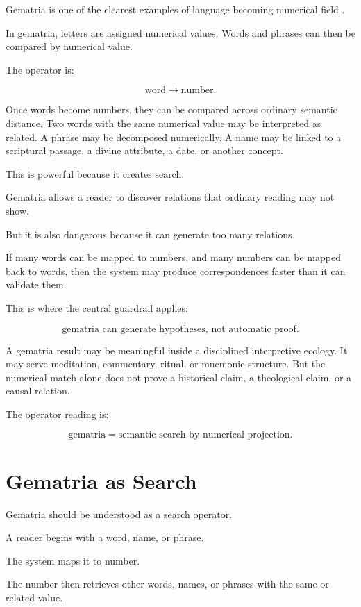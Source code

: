 \documentclass[11pt]{book}
\begin{document}
Gematria is one of the clearest examples of language becoming numerical field \cite{Scholem1974Kabbalah,Idel1988KabbalahNewPerspectives,Eco1995SearchPerfectLanguage}.

In gematria, letters are assigned numerical values. Words and phrases can then be compared by numerical value.

The operator is:

\[
\text{word} \rightarrow \text{number}.
\]

Once words become numbers, they can be compared across ordinary semantic distance. Two words with the same numerical value may be interpreted as related. A phrase may be decomposed numerically. A name may be linked to a scriptural passage, a divine attribute, a date, or another concept.

This is powerful because it creates search.

Gematria allows a reader to discover relations that ordinary reading may not show.

But it is also dangerous because it can generate too many relations.

If many words can be mapped to numbers, and many numbers can be mapped back to words, then the system may produce correspondences faster than it can validate them.

This is where the central guardrail applies:

\[
\text{gematria can generate hypotheses, not automatic proof}.
\]

A gematria result may be meaningful inside a disciplined interpretive ecology. It may serve meditation, commentary, ritual, or mnemonic structure. But the numerical match alone does not prove a historical claim, a theological claim, or a causal relation.

The operator reading is:

\[
\text{gematria} = \text{semantic search by numerical projection}.
\]

\section{Gematria as Search}

Gematria should be understood as a search operator.

A reader begins with a word, name, or phrase.

The system maps it to number.

The number then retrieves other words, names, or phrases with the same or related value.
\end{document}

